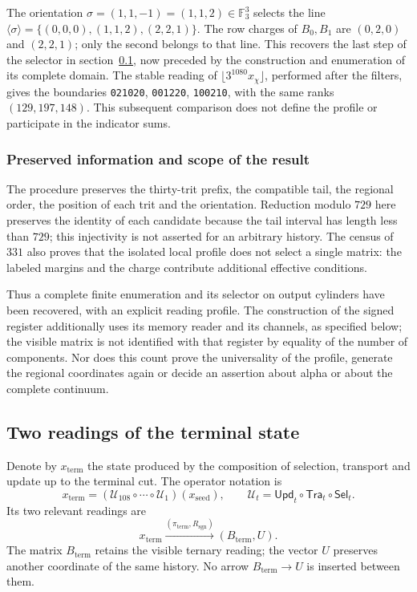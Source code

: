 The orientation \(\sigma=(1,1,-1)=(1,1,2)\in\mathbb F_3^3\)
selects the line
\(\langle\sigma\rangle=\{(0,0,0),(1,1,2),(2,2,1)\}\).
The row charges of \(B_0,B_1\) are \((0,2,0)\) and \((2,2,1)\);
only the second belongs to that line. This recovers the last step
of the selector in section~\ref{x_reciprocidad:subsec:k-terminal}, now preceded by
the construction and enumeration of its complete domain. The stable reading
of \(\lfloor3^{1080}x_\chi\rfloor\), performed after the filters,
gives the boundaries \texttt{021020}, \texttt{001220}, \texttt{100210},
with the same ranks \((129,197,148)\). This subsequent comparison does not define
the profile or participate in the indicator sums.

\subsubsection{Preserved information and scope of the result}

The procedure preserves the thirty-trit prefix, the compatible tail,
the regional order, the position of each trit and the orientation. Reduction
modulo \(729\) here preserves the identity of each candidate because the
tail interval has length less than \(729\); this injectivity
is not asserted for an arbitrary history. The census of \(331\) also proves
that the isolated local profile does not select a single matrix: the
labeled margins and the charge contribute additional effective conditions.

Thus a complete finite enumeration and its selector
on output cylinders have been recovered, with an explicit reading profile. The construction
of the signed register additionally uses its memory reader and its channels,
as specified below; the visible matrix is not identified with
that register by equality of the number of components. Nor does this count
prove the universality of the profile, generate the regional coordinates
again or decide an assertion about alpha or about the complete continuum.



\subsection{Two readings of the terminal state}
\label{x_reciprocidad:subsec:k-terminal}

Denote by \(x_{\mathrm{term}}\) the state produced by the composition
of selection, transport and update up to the terminal cut. The
operator notation is
\[
 x_{\mathrm{term}}=
 (\mathcal U_{108}\circ\cdots\circ\mathcal U_1)(x_{\mathrm{seed}}),
 \qquad \mathcal U_t=\mathsf{Upd}_t\circ\mathsf{Tra}_t\circ\mathsf{Sel}_t.
\]
Its two relevant readings are
\[
 x_{\mathrm{term}}
 \xrightarrow{(\pi_{\mathrm{term}},R_{\mathrm{sgn}})}
 (B_{\mathrm{term}},U).
\]
The matrix \(B_{\mathrm{term}}\) retains the visible ternary reading; the
vector \(U\) preserves another coordinate of the same history. No arrow
\(B_{\mathrm{term}}\to U\) is inserted between them.


